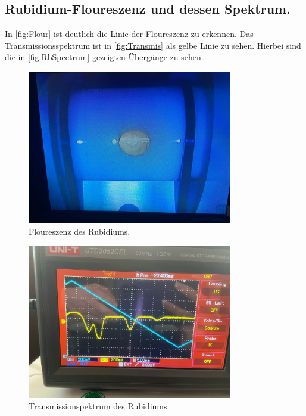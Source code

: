 \subsection{Rubidium-Floureszenz und dessen Spektrum.}
\label{sec:Ausw2}
In \autoref{fig:Flour} ist deutlich die Linie der Floureszenz zu erkennen. Das Transmissionsspektrum ist in \autoref{fig:Transmis} als gelbe Linie zu sehen. Hierbei sind die in \autoref{fig:RbSpectrum} gezeigten Übergänge zu sehen.

\begin{figure}
    \centering
        \includegraphics[width=0.8\textwidth]{Luminiszenz.jpeg}
        \caption{Floureszenz des Rubidiums.}
        \label{fig:Flour} 
\end{figure}

\begin{figure}
    \centering
        \includegraphics[width=0.8\textwidth]{Spectrum.jpeg}
        \caption{Transmissionspektrum des Rubidiums.}
        \label{fig:Transmis} 
\end{figure}